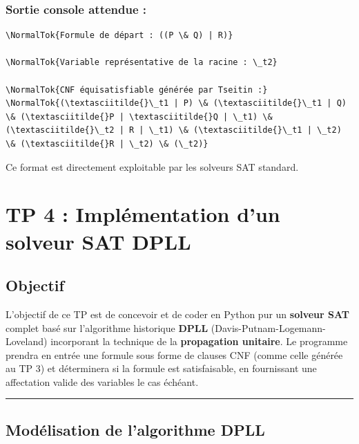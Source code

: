 \documentclass[11pt,a4paper]{article}
\begin{document}
\hypertarget{sortie-console-attendue}{%
\subsubsection{Sortie console attendue
:}\label{sortie-console-attendue}}

\begin{lstlisting}
\NormalTok{Formule de départ : ((P \& Q) | R)}

\NormalTok{Variable représentative de la racine : \_t2}

\NormalTok{CNF équisatisfiable générée par Tseitin :}
\NormalTok{(\textasciitilde{}\_t1 | P) \& (\textasciitilde{}\_t1 | Q) \& (\textasciitilde{}P | \textasciitilde{}Q | \_t1) \& (\textasciitilde{}\_t2 | R | \_t1) \& (\textasciitilde{}\_t1 | \_t2) \& (\textasciitilde{}R | \_t2) \& (\_t2)}
\end{lstlisting}

Ce format est directement exploitable par les solveurs SAT standard.
\n
\hypertarget{tp-4-impluxe9mentation-dun-solveur-sat-dpll}{%
\section{TP 4 : Implémentation d'un solveur SAT
DPLL}\label{tp-4-impluxe9mentation-dun-solveur-sat-dpll}}

\hypertarget{objectif}{%
\subsection{Objectif}\label{objectif}}

L'objectif de ce TP est de concevoir et de coder en Python pur un
\textbf{solveur SAT} complet basé sur l'algorithme historique
\textbf{DPLL} (Davis-Putnam-Logemann-Loveland) incorporant la technique
de la \textbf{propagation unitaire}. Le programme prendra en entrée une
formule sous forme de clauses CNF (comme celle générée au TP 3) et
déterminera si la formule est satisfaisable, en fournissant une
affectation valide des variables le cas échéant.

\begin{center}\rule{0.5\linewidth}{0.5pt}\end{center}

\hypertarget{moduxe9lisation-de-lalgorithme-dpll}{%
\subsection{Modélisation de l'algorithme
DPLL}\label{moduxe9lisation-de-lalgorithme-dpll}}
\end{document}
